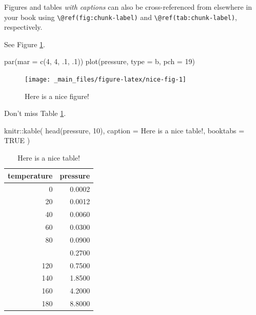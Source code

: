 \documentclass[
]{book}
\newenvironment{Shaded}{\begin{snugshade}}{\end{snugshade}}
\newcommand{\AttributeTok}[1]{\textcolor[rgb]{0.77,0.63,0.00}{#1}}
\newcommand{\ConstantTok}[1]{\textcolor[rgb]{0.00,0.00,0.00}{#1}}
\newcommand{\DecValTok}[1]{\textcolor[rgb]{0.00,0.00,0.81}{#1}}
\newcommand{\FunctionTok}[1]{\textcolor[rgb]{0.00,0.00,0.00}{#1}}
\newcommand{\NormalTok}[1]{#1}
\newcommand{\SpecialCharTok}[1]{\textcolor[rgb]{0.00,0.00,0.00}{#1}}
\newcommand{\StringTok}[1]{\textcolor[rgb]{0.31,0.60,0.02}{#1}}
\theoremstyle{definition}
\theoremstyle{definition}
\theoremstyle{definition}
\theoremstyle{definition}
\theoremstyle{remark}
\begin{document}
Figures and tables \emph{with captions} can also be cross-referenced from elsewhere in your book using \texttt{\textbackslash{}@ref(fig:chunk-label)} and \texttt{\textbackslash{}@ref(tab:chunk-label)}, respectively.

See Figure \ref{fig:nice-fig}.

\begin{Shaded}
\begin{Highlighting}[]
\FunctionTok{par}\NormalTok{(}\AttributeTok{mar =} \FunctionTok{c}\NormalTok{(}\DecValTok{4}\NormalTok{, }\DecValTok{4}\NormalTok{, .}\DecValTok{1}\NormalTok{, .}\DecValTok{1}\NormalTok{))}
\FunctionTok{plot}\NormalTok{(pressure, }\AttributeTok{type =} \StringTok{\textquotesingle{}b\textquotesingle{}}\NormalTok{, }\AttributeTok{pch =} \DecValTok{19}\NormalTok{)}
\end{Highlighting}
\end{Shaded}

\begin{figure}

{\centering \texttt{[image: \_main\_files/figure-latex/nice-fig-1]} 

}

\caption{Here is a nice figure!}\label{fig:nice-fig}
\end{figure}

Don't miss Table \ref{tab:nice-tab}.

\begin{Shaded}
\begin{Highlighting}[]
\NormalTok{knitr}\SpecialCharTok{::}\FunctionTok{kable}\NormalTok{(}
  \FunctionTok{head}\NormalTok{(pressure, }\DecValTok{10}\NormalTok{), }\AttributeTok{caption =} \StringTok{\textquotesingle{}Here is a nice table!\textquotesingle{}}\NormalTok{,}
  \AttributeTok{booktabs =} \ConstantTok{TRUE}
\NormalTok{)}
\end{Highlighting}
\end{Shaded}

\begin{table}

\caption{\label{tab:nice-tab}Here is a nice table!}
\centering
\begin{tabular}[t]{rr}
\toprule
temperature & pressure\\
\midrule
0 & 0.0002\\
20 & 0.0012\\
40 & 0.0060\\
60 & 0.0300\\
80 & 0.0900\\
\addlinespace
100 & 0.2700\\
120 & 0.7500\\
140 & 1.8500\\
160 & 4.2000\\
180 & 8.8000\\
\bottomrule
\end{tabular}
\end{table}
\end{document}
